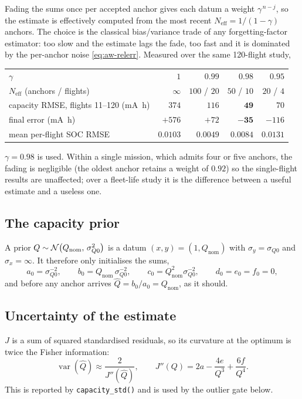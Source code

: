 Fading the sums once per accepted anchor gives each datum a weight $\gamma^{\,n-j}$, so the estimate
is effectively computed from the most recent $N_\text{eff}=1/(1-\gamma)$ anchors.  The choice is the
classical bias/variance trade of any forgetting-factor estimator: too slow and the estimate lags the
fade, too fast and it is dominated by the per-anchor noise \eqref{eq:aw-relerr}.  Measured over the
same 120-flight study,
\begin{center}
\begin{tabular}{@{}lrrrr@{}}
\toprule
$\gamma$ & $1$ & $0.99$ & $\mathbf{0.98}$ & $0.95$\\
$N_\text{eff}$ (anchors / flights) & $\infty$ & $100$ / $20$ & $50$ / $10$ & $20$ / $4$\\
\midrule
capacity RMSE, flights 11--120 (\si{\milli\ampere\hour}) & $374$ & $116$ & $\mathbf{49}$ & $70$\\
final error (\si{\milli\ampere\hour})                    & $+576$ & $+72$ & $\mathbf{-35}$ & $-116$\\
mean per-flight SOC RMSE                                 & $0.0103$ & $0.0049$ & $0.0084$ & $0.0131$\\
\bottomrule
\end{tabular}
\end{center}
$\gamma=0.98$ is used.  Within a single mission, which admits four or five anchors, the fading is
negligible (the oldest anchor retains a weight of $0.92$) so the single-flight results are
unaffected; over a fleet-life study it is the difference between a useful estimate and a useless one.

\subsection{The capacity prior}
A prior $Q\sim\mathcal{N}\!\left(Q_\text{nom},\,\sigma_{Q0}^2\right)$ is a datum $(x,y)=(1,Q_\text{nom})$ with
$\sigma_y=\sigma_{Q0}$ and $\sigma_x=\infty$.  It therefore only initialises the sums,
\begin{equation}
a_0=\sigma_{Q0}^{-2},\qquad b_0=Q_\text{nom}\,\sigma_{Q0}^{-2},\qquad c_0=Q_\text{nom}^2\sigma_{Q0}^{-2},\qquad d_0=e_0=f_0=0,
\label{eq:aw-prior}
\end{equation}
and before any anchor arrives $\hat Q=b_0/a_0=Q_\text{nom}$, as it should.

\subsection{Uncertainty of the estimate}
$J$ is a sum of squared standardised residuals, so its curvature at the optimum is twice the Fisher
information:
\begin{equation}
\operatorname{var}(\hat Q)\approx\frac{2}{J''(\hat Q)},\qquad
J''(Q)=2a-\frac{4e}{Q^3}+\frac{6f}{Q^4}.
\label{eq:aw-var}
\end{equation}
This is reported by \texttt{capacity\_std()} and is used by the outlier gate below.

